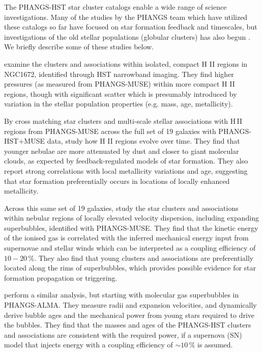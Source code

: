\documentclass[linenumbers]{aastex63}
\begin{document}
The PHANGS-HST star cluster catalogs enable a wide range of science investigations. Many of the studies by the PHANGS team which have utilized these catalogs so far have focused on star formation feedback and timescales, but investigations of the old stellar populations (globular clusters) has also begun \citep{floyd}. We briefly describe some of these studies below.

\citet{barnes_linking_2022} examine the clusters and associations within isolated, compact H II regions in NGC1672, identified through HST narrowband imaging.  They find higher pressures (as measured from PHANGS-MUSE) within more compact H II regions, though with significant scatter which is presumably introduced by variation in the stellar population properties (e.g. mass, age, metallicity). 

By cross matching star clusters and multi-scale stellar associations with H\,II regions from PHANGS-MUSE across the full set of 19 galaxies with PHANGS-HST$+$MUSE data, \citet{scheuermann_stellar_2023} study how H II regions evolve over time.   They find that younger nebulae are more attenuated by dust and closer to giant molecular clouds, as expected by feedback-regulated models of star formation.  They also report strong correlations with local metallicity variations and age, suggesting that star formation preferentially occurs in locations of locally enhanced metallicity. 

Across this same set of 19 galaxies, \citet{egorov_quantifying_2023} study the star clusters and associations within nebular regions of locally elevated velocity dispersion, including expanding superbubbles, identified with PHANGS-MUSE.  They find that the kinetic energy of the ionised gas is correlated with the inferred mechanical energy input from supernovae and stellar winds %
which can be interpreted as a coupling efficiency of $10-20\,\%$. They also find that young clusters and associations are preferentially located along the rims of superbubbles, which provides possible evidence for star formation propagation or triggering. 

\citet{watkins_quantifying_2023} perform a similar analysis, but starting with molecular gas superbubbles in PHANGS-ALMA.  They measure radii and expansion velocities, and dynamically derive bubble ages and the mechanical power from young stars required to drive the bubbles. They find that the masses and ages of the PHANGS-HST clusters and associations are consistent with the required power, if a supernova (SN) model that injects energy with a coupling efficiency of $\sim10\,\%$ is assumed.  
\end{document}

